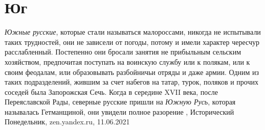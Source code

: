  
 
 
 
 
\chapter{Юг}

\emph{Южные русские}, которые стали называться малороссами, никогда не
испытывали таких трудностей, они не зависели от погоды, потому и имели характер
чересчур расслабленный. Постепенно они бросали занятия не прибыльным сельским
хозяйством, предпочитая поступать на воинскую службу или к полякам, или к своим
феодалам, или образовывать разбойничьи отряды и даже армии. Одним из таких
подразделений, жившим за счет набегов на татар, турок, поляков и прочих соседей
была Запорожская Сечь. Когда в середине XVII века, после Переяславской Рады,
северные русские пришли на \emph{Южную Русь}, которая называлась Гетманщиной,
они увидели полное разорение
, 
Исторический Понедельник, zen.yandex.ru, 11.06.2021

